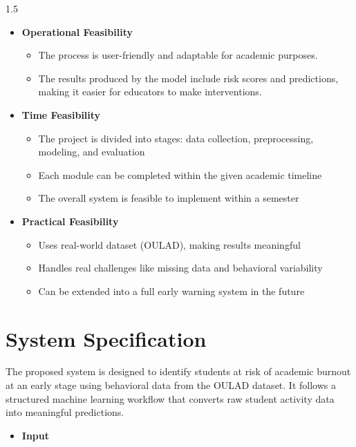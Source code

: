 \begin{spacing}{1.5}
\begin{itemize}
\begin{itemize}
\end{itemize}
\item \textbf{Operational Feasibility}
\begin{itemize}
    \item The process is user-friendly and adaptable for academic purposes. 
\item The results produced by the model include risk scores and predictions, making it easier for educators to make interventions.

\end{itemize}
\item \textbf{Time Feasibility}
\begin{itemize}
    \item The project is divided into stages: data collection, preprocessing, modeling, and evaluation

\item Each module can be completed within the given academic timeline

\item The overall system is feasible to implement within a semester
\end{itemize}
\item \textbf{Practical Feasibility}
\begin{itemize}
    \item Uses real-world dataset (OULAD), making results meaningful
\item Handles real challenges like missing data and behavioral variability

\item Can be extended into a full early warning system in the future

\end{itemize}




\end{itemize}




\section{System Specification}
The proposed system is designed to identify students at risk of academic burnout at an early stage using behavioral data from the OULAD dataset. It follows a structured machine learning workflow that converts raw student activity data into meaningful predictions.

\begin{itemize}
    \item \textbf{Input}


\end{itemize}
\end{spacing}
